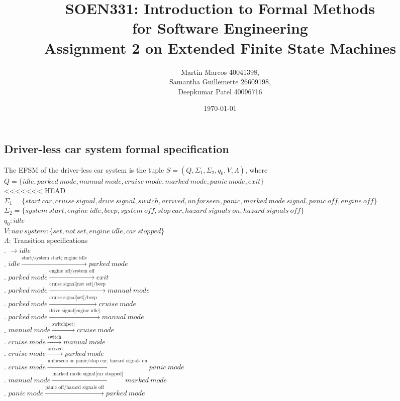 \documentclass[12pt]{article}
\title{SOEN331: Introduction to Formal Methods\\for Software Engineering\\
Assignment 2 on Extended Finite State Machines}
\author{Martin Marcos 40041398,\\ Samantha Guillemette 26609198,\\ Deepkumar Patel 40096716  }
\date{\today}
\begin{document}
\begin{spacing}{1.5}

\maketitle

\newpage


\section{Driver-less car system formal specification}

\noindent The EFSM of the driver-less car system is the tuple $S = (Q, \Sigma_1, \Sigma_2, q_0, V, \Lambda)$, where\\

\noindent $Q = \{idle, parked~mode, manual~mode, cruise~mode, marked~mode, panic~mode, exit\}$\\
<<<<<<< HEAD
\noindent $\Sigma_1 = \{start~car, cruise~signal, drive~signal, switch, arrived, unforseen,panic,marked~mode~signal, panic~off, engine~off\}$\\
\noindent $\Sigma_2 = \{system~start, engine~idle, beep, system~off, stop~car, hazard~signals~on, hazard~signals~off\}$\\
\noindent $q_0: idle$\\
\noindent $V: nav~system: \{set, not~set, engine~idle, car~stopped\}$\\
\noindent $\Lambda$: Transition specifications\\
. $\rightarrow idle$\\
. $idle \xrightarrow {\text {start/system start; engine idle}} parked~mode$\\
. $parked~mode  \xrightarrow {\text {engine off/system off}} exit$\\
. $parked~mode  \xrightarrow {\text {cruise signal[not set]/beep}} manual~mode$\\
. $parked~mode  \xrightarrow {\text {cruise signal[set]/beep}} cruise~mode$\\
. $parked~mode  \xrightarrow {\text {drive signal[engine idle]}} manual~mode$\\
. $manual~mode  \xrightarrow {\text {switch[set]}} cruise~mode$\\
. $cruise~mode  \xrightarrow {\text {switch}} manual~mode$\\
. $cruise~mode  \xrightarrow {\text {arrived}} parked~mode$\\
. $cruise~mode  \xrightarrow {\text {unforseen or panic/stop car; hazard signals on}} panic~mode$\\
. $manual~mode  \xrightarrow {\text {marked mode signal[car stopped]}} marked~mode$\\
. $panic~mode  \xrightarrow {\text {panic off/hazard signals off}} parked~mode$\\


\end{spacing}
\end{document}
